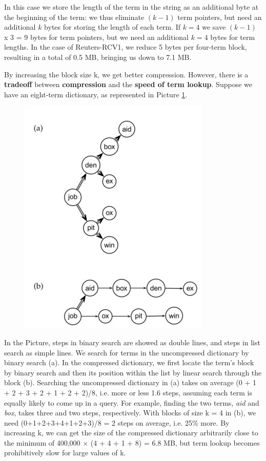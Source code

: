 In this case we store the length of the term in the string as an additional byte at the beginning of the term: we thus eliminate $(k-1)$ term pointers, but need an additional $k$ bytes for storing the length of each term. If $k = 4$ we save $(k-1)$ x 3 = 9 bytes for term pointers, but we need an additional $k = 4$ bytes for term lengths. In the case of Reuters-RCV1, we reduce 5 bytes per four-term block, resulting in a total of 0.5 MB, bringing us down to 7.1 MB.

By increasing the block size k, we get better compression. However, there is a \textbf{tradeoff} between \textbf{compression} and the \textbf{speed of term lookup}. Suppose we have an eight-term dictionary, as represented in Picture \ref{example}.

\begin{figure}[h!]
		\centering
		\includegraphics[scale = 1.7]{img/example .jpg}
		\label{example}
\end{figure}

In the Picture, steps in binary search are showed as double lines, and steps in list search as simple lines. We search for terms in the uncompressed dictionary by binary search (a). In the compressed dictionary, we first locate the term’s block by binary search and then its position within the list by linear search through the block (b). Searching the uncompressed dictionary in (a) takes on average (0 + 1 + 2 + 3 + 2 + 1 + 2 + 2)/8, i.e. more or less 1.6 steps, assuming each term is equally likely to come up in a query. For example, finding the two terms, \textit{aid} and \textit{box}, takes three and two steps, respectively. With blocks of size k = 4 in (b), we need (0+1+2+3+4+1+2+3)/8 = 2 steps on average, i.e. 25\% more. By increasing k, we can get the size of the compressed dictionary arbitrarily close to the minimum of 400,000 × (4 + 4 + 1 + 8) = 6.8 MB, but term lookup becomes prohibitively slow for large values of k.


